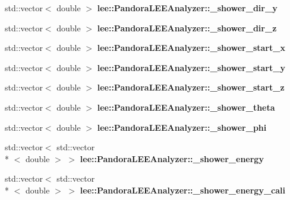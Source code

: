 \begin{DoxyCompactItemize}
\item 
\hypertarget{group__lee_gaa08672578dd6c1729649fa54a1725401}{std\-::vector$<$ double $>$ {\bfseries lee\-::\-Pandora\-L\-E\-E\-Analyzer\-::\-\_\-shower\-\_\-dir\-\_\-y}}\label{group__lee_gaa08672578dd6c1729649fa54a1725401}

\item 
\hypertarget{group__lee_gaee2bf39916f97db6bee077df4020662f}{std\-::vector$<$ double $>$ {\bfseries lee\-::\-Pandora\-L\-E\-E\-Analyzer\-::\-\_\-shower\-\_\-dir\-\_\-z}}\label{group__lee_gaee2bf39916f97db6bee077df4020662f}

\item 
\hypertarget{group__lee_ga8d3d2b24d81dc924d1f972bf3748dd76}{std\-::vector$<$ double $>$ {\bfseries lee\-::\-Pandora\-L\-E\-E\-Analyzer\-::\-\_\-shower\-\_\-start\-\_\-x}}\label{group__lee_ga8d3d2b24d81dc924d1f972bf3748dd76}

\item 
\hypertarget{group__lee_gae12d2a6c7e2d78fc9d7e6f30ce959fa7}{std\-::vector$<$ double $>$ {\bfseries lee\-::\-Pandora\-L\-E\-E\-Analyzer\-::\-\_\-shower\-\_\-start\-\_\-y}}\label{group__lee_gae12d2a6c7e2d78fc9d7e6f30ce959fa7}

\item 
\hypertarget{group__lee_gafef1c0810411173778fa2ea099cbb03f}{std\-::vector$<$ double $>$ {\bfseries lee\-::\-Pandora\-L\-E\-E\-Analyzer\-::\-\_\-shower\-\_\-start\-\_\-z}}\label{group__lee_gafef1c0810411173778fa2ea099cbb03f}

\item 
\hypertarget{group__lee_ga3ad8af27c4c242410ffe4c1e1407e3c0}{std\-::vector$<$ double $>$ {\bfseries lee\-::\-Pandora\-L\-E\-E\-Analyzer\-::\-\_\-shower\-\_\-theta}}\label{group__lee_ga3ad8af27c4c242410ffe4c1e1407e3c0}

\item 
\hypertarget{group__lee_ga97c2d25dc1e253d867353b1c4562967c}{std\-::vector$<$ double $>$ {\bfseries lee\-::\-Pandora\-L\-E\-E\-Analyzer\-::\-\_\-shower\-\_\-phi}}\label{group__lee_ga97c2d25dc1e253d867353b1c4562967c}

\item 
\hypertarget{group__lee_gaf1fab9490fef935944f24feb7450f76c}{std\-::vector$<$ std\-::vector\\*
$<$ double $>$ $>$ {\bfseries lee\-::\-Pandora\-L\-E\-E\-Analyzer\-::\-\_\-shower\-\_\-energy}}\label{group__lee_gaf1fab9490fef935944f24feb7450f76c}

\item 
\hypertarget{group__lee_gac5a201dfcee71af90a4076c07a959ebf}{std\-::vector$<$ std\-::vector\\*
$<$ double $>$ $>$ {\bfseries lee\-::\-Pandora\-L\-E\-E\-Analyzer\-::\-\_\-shower\-\_\-energy\-\_\-cali}}\label{group__lee_gac5a201dfcee71af90a4076c07a959ebf}


\end{DoxyCompactItemize}
